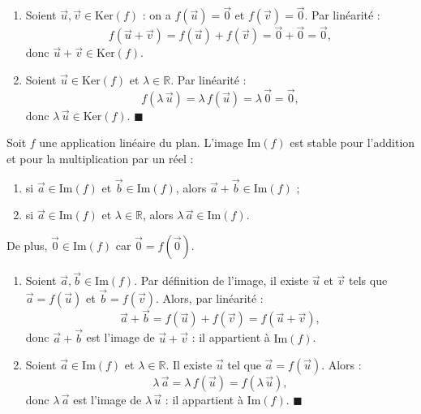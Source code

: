 \documentclass[11pt]{article}
\begin{document}
\begin{experience}
\begin{enumerate}
\item Soient $\vec{u}, \vec{v} \in \mathrm{Ker}(f)$ : on a $f(\vec{u}) = \vec{0}$ et $f(\vec{v}) = \vec{0}$. Par linéarité :
\[ f(\vec{u} + \vec{v}) = f(\vec{u}) + f(\vec{v}) = \vec{0} + \vec{0} = \vec{0}, \]
donc $\vec{u} + \vec{v} \in \mathrm{Ker}(f)$.
\item Soient $\vec{u} \in \mathrm{Ker}(f)$ et $\lambda \in \mathbb{R}$. Par linéarité :
\[ f(\lambda\,\vec{u}) = \lambda\,f(\vec{u}) = \lambda\,\vec{0} = \vec{0}, \]
donc $\lambda\,\vec{u} \in \mathrm{Ker}(f)$. \hfill$\blacksquare$
\end{enumerate}
\end{experience}

\begin{propriete}
Soit $f$ une application linéaire du plan. L'image $\mathrm{Im}(f)$ est stable pour l'addition et pour la multiplication par un réel :
\begin{enumerate}
\item si $\vec{a} \in \mathrm{Im}(f)$ et $\vec{b} \in \mathrm{Im}(f)$, alors $\vec{a} + \vec{b} \in \mathrm{Im}(f)$ ;
\item si $\vec{a} \in \mathrm{Im}(f)$ et $\lambda \in \mathbb{R}$, alors $\lambda\,\vec{a} \in \mathrm{Im}(f)$.
\end{enumerate}
De plus, $\vec{0} \in \mathrm{Im}(f)$ car $\vec{0} = f(\vec{0})$.
\end{propriete}

\begin{experience}
\begin{enumerate}
\item Soient $\vec{a}, \vec{b} \in \mathrm{Im}(f)$. Par définition de l'image, il existe $\vec{u}$ et $\vec{v}$ tels que $\vec{a} = f(\vec{u})$ et $\vec{b} = f(\vec{v})$. Alors, par linéarité :
\[ \vec{a} + \vec{b} = f(\vec{u}) + f(\vec{v}) = f(\vec{u} + \vec{v}), \]
donc $\vec{a} + \vec{b}$ est l'image de $\vec{u} + \vec{v}$ : il appartient à $\mathrm{Im}(f)$.
\item Soient $\vec{a} \in \mathrm{Im}(f)$ et $\lambda \in \mathbb{R}$. Il existe $\vec{u}$ tel que $\vec{a} = f(\vec{u})$. Alors :
\[ \lambda\,\vec{a} = \lambda\,f(\vec{u}) = f(\lambda\,\vec{u}), \]
donc $\lambda\,\vec{a}$ est l'image de $\lambda\,\vec{u}$ : il appartient à $\mathrm{Im}(f)$. \hfill$\blacksquare$
\end{enumerate}
\end{experience}
\end{document}
